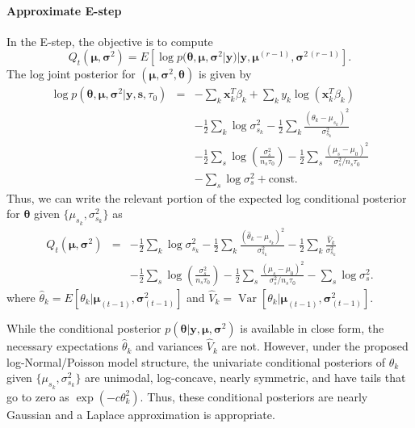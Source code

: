 \documentclass[12pt]{article}
\DeclareMathOperator{\Var}{Var}
\begin{document}
\paragraph{Approximate E-step}
%
In the E-step, the objective is to compute 
\begin{equation} 
  Q_t(\bm \mu, \bm \sigma^2) = E \left[ \log p(\bm \theta, \bm \mu, \bm \sigma^2 | \bm y ) | \bm y, \bm \mu^{(r-1)}, \bm \sigma^{2\,(r-1)} \right].
\end{equation}
%
The log joint posterior for $(\bm \mu, \bm \sigma^2, \bm \theta)$ is given by
\begin{eqnarray}\label{eq:logPosterior}
 \log p(\bm \theta, \bm \mu, \bm \sigma^2 | \bm y, \bm s, \tau_0) &=& -\sum_k
\bm x_k^T \beta_k + \sum_k y_k \log \left( \bm x_k^T \beta_k \right)  \\
 \nonumber && - \frac{1}{2} \sum_k \log \sigma^2_{s_k} -
  \frac{1}{2} \sum_k \frac{(\theta_k - \mu_{s_k})^2}{\sigma^2_{s_k}} \\
 \nonumber && - \frac{1}{2} \sum_s \log \left( \frac{\sigma^2_{s}}{n_{s} \tau_0}
  \right) - \frac{1}{2} \sum_s \frac{(\mu_s - \mu_0)^2}{\sigma^2_{s} / n_{s} \tau_0} \\
  \nonumber && - \sum_s \log \sigma^2_s + \mathrm{const}.
\end{eqnarray}
%
Thus, we can write the relevant portion of the expected log conditional
posterior for $\bm \theta$ given $\{\mu_{s_k}, \sigma^2_{s_k}\}$ as
\begin{eqnarray}
 Q_t(\bm \mu, \bm \sigma^2) &=& - \frac{1}{2} \sum_k \log \sigma^2_{s_k} -
  \frac{1}{2} \sum_k \frac{(\hat{\theta}_k - \mu_{s_k})^2}{\sigma^2_{s_k}}
 - \frac{1}{2} \sum_k \frac{\hat{V}_k}{\sigma^2_{s_k}} \\
 \nonumber && - \frac{1}{2} \sum_s \log \left( \frac{\sigma^2_{s}}{n_{s} \tau_0}
  \right) - \frac{1}{2} \sum_s \frac{(\mu_s - \mu_0)^2}{\sigma^2_{s} / n_{s} \tau_0}
 - \sum_s \log \sigma^2_s.
\end{eqnarray}
where $\hat{\theta}_k = E[ \theta_k | \bm \mu_{(t-1)}, \bm \sigma^2_{(t-1)} ]$
and $\hat{V}_k = \Var [ \theta_k | \bm \mu_{(t-1)}, \bm \sigma^2_{(t-1)} ]$. 

While the conditional posterior $p(\bm \theta | \bm y, \bm \mu, \bm \sigma^2 )$ is available in close form,  the necessary  expectations $\hat{\theta}_k$ and variances $\hat V_k$ are not.
However, under the proposed log-Normal/Poisson model structure, the univariate conditional posteriors of $\theta_k$ given $\{\mu_{s_k}, \sigma^2_{s_k}\}$ are unimodal, log-concave, nearly symmetric, and have tails that go to zero as $\exp(-c \theta_k^2)$. 
Thus, these conditional posteriors are nearly Gaussian and a Laplace approximation is appropriate. 
\end{document}
